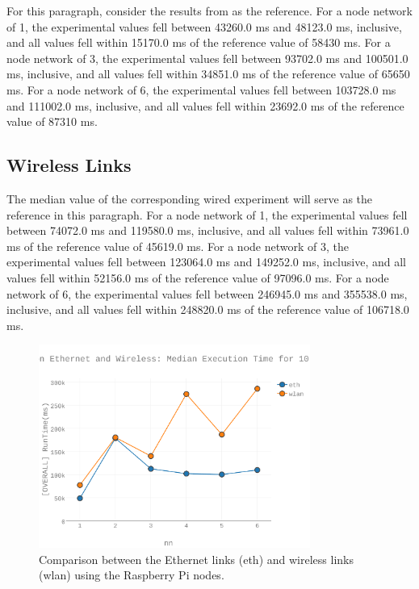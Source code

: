 For this paragraph, consider the results from \cite{Abramova2014} as the reference.  For a node network of 1, the experimental values fell between 43260.0 ms and 48123.0 ms, inclusive, and all values fell within 15170.0 ms of the reference value of 58430 ms.  For a node network of 3, the experimental values fell between 93702.0 ms and 100501.0 ms, inclusive, and all values fell within 34851.0 ms of the reference value of 65650 ms.  For a node network of 6, the experimental values fell between 103728.0 ms and 111002.0 ms, inclusive, and all values fell within 23692.0 ms of the reference value of 87310 ms.  

\subsection{Wireless Links}

The median value of the corresponding wired experiment will serve as the reference in this paragraph. For a node network of 1, the experimental values fell between 74072.0 ms and 119580.0 ms, inclusive, and all values fell within 73961.0 ms of the reference value of 45619.0 ms.  For a node network of 3, the experimental values fell between 123064.0 ms and 149252.0 ms, inclusive, and all values fell within 52156.0 ms of the reference value of 97096.0 ms.  For a node network of 6, the experimental values fell between 246945.0 ms and 355538.0 ms, inclusive, and all values fell within 248820.0 ms of the reference value of 106718.0 ms.

\begin{figure}[h]
\includegraphics[width=3.5in]{Figures/figures-wlc_fig7.pdf}

\caption{Comparison between the Ethernet links (eth) and wireless links (wlan) using the Raspberry Pi nodes.}

\label{fig:fig07}
\end{figure}

